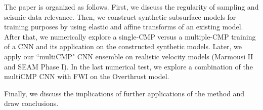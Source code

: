 \documentclass[paper,twocolomn]{geophysics}
\begin{document}
The paper is organized as follows. First, we discuss the regularity of sampling and seismic data relevance.
%
Then, we construct synthetic subsurface models for training purposes by using elastic and affine transforms of an existing model.
%
After that, we numerically explore a single-CMP versus a multiple-CMP training of a CNN and its application on the constructed synthetic models.
%
%
Later, we apply our ``multiCMP" CNN ensemble on realistic velocity models (Marmousi II and SEAM Phase I). 
%
In the last numerical test, we explore a combination of the multiCMP CNN with FWI on the Overthrust model. 

Finally, we discuss the implications of further applications of the method and draw conclusions.
\end{document}
